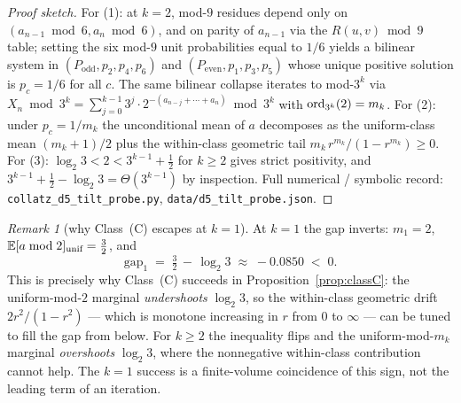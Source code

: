 \documentclass[11pt]{amsart}
\theoremstyle{definition}
\theoremstyle{remark}
\newtheorem{remark}[theorem]{Remark}
\begin{document}
\begin{proof}[Proof sketch]
For (1): at $k=2$, mod-$9$ residues depend only on $(a_{n-1}\bmod 6,a_n\bmod 6)$, and on parity of
$a_{n-1}$ via the $R(u,v)\bmod 9$ table; setting the six mod-$9$ unit probabilities equal to $1/6$
yields a bilinear system in $(P_{\text{odd}},p_2,p_4,p_6)$ and $(P_{\text{even}},p_1,p_3,p_5)$ whose
unique positive solution is $p_c=1/6$ for all $c$. The same bilinear collapse iterates to mod-$3^k$
via $X_n\bmod 3^k=\sum_{j=0}^{k-1}3^j\cdot 2^{-(a_{n-j}+\cdots+a_n)}\bmod 3^k$ with $\operatorname{ord}_{3^k}(2)=m_k$.
For (2): under $p_c=1/m_k$ the unconditional mean of $a$ decomposes as the uniform-class mean
$(m_k+1)/2$ plus the within-class geometric tail $m_k\,r^{m_k}/(1-r^{m_k})\ge 0$. For (3):
$\log_2 3<2<3^{k-1}+\tfrac12$ for $k\ge 2$ gives strict positivity, and $3^{k-1}+\tfrac12-\log_2 3=
\Theta(3^{k-1})$ by inspection. Full numerical / symbolic record: \texttt{collatz\_d5\_tilt\_probe.py},
\texttt{data/d5\_tilt\_probe.json}.
\end{proof}

\begin{remark}[why Class~(C) escapes at $k=1$]\label{rem:k1-escape}
At $k=1$ the gap inverts: $m_1=2$, $\mathbb{E}[a\bmod 2]_{\text{unif}}=\tfrac32$, and
\[
  \mathrm{gap}_1\;=\;\tfrac32\,-\,\log_2 3\;\approx\;-0.0850\;<\;0.
\]
This is precisely why Class~(C) succeeds in Proposition~\ref{prop:classC}: the uniform-mod-$2$ marginal
\emph{undershoots} $\log_2 3$, so the within-class geometric drift $2r^2/(1-r^2)$ --- which is monotone
increasing in $r$ from $0$ to $\infty$ --- can be tuned to fill the gap from below. For $k\ge 2$ the
inequality flips and the uniform-mod-$m_k$ marginal \emph{overshoots} $\log_2 3$, where the
nonnegative within-class contribution cannot help. The $k=1$ success is a finite-volume coincidence of
this sign, not the leading term of an iteration.
\end{remark}
\end{document}

